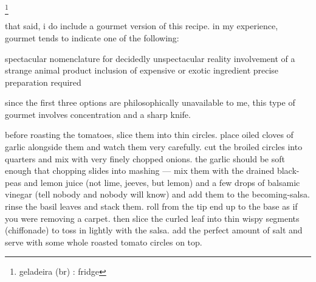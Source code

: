 \footnote{geladeira (br) : fridge}

that said, i do include a gourmet version of this recipe. in my experience, gourmet tends to indicate one of the following:

spectacular nomenclature for decidedly unspectacular reality
involvement of a strange animal product
inclusion of expensive or exotic ingredient
precise preparation required

since the first three options are philosophically unavailable to me, this type of gourmet involves concentration and a sharp knife.

	before roasting the tomatoes, slice them into thin circles. place oiled cloves of garlic alongside them and watch them very carefully. cut the broiled circles into quarters and mix with very finely chopped onions. the garlic should be soft enough that chopping slides into mashing --- mix them with the drained black-peas and lemon juice (not lime, jeeves, but lemon) and a few drops of balsamic vinegar (tell nobody and nobody will know) and add them to the becoming-salsa. rinse the basil leaves and stack them. roll from the tip end up to the base as if you were removing a carpet. then slice the curled leaf into thin wispy segments (chiffonade) to toss in lightly with the salsa. add the perfect amount of salt and serve with some whole roasted tomato circles on top.
